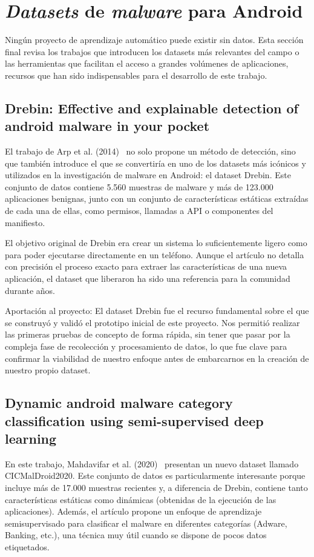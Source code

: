 \section{\textit{Datasets} de \textit{malware} para Android}

Ningún proyecto de aprendizaje automático puede existir sin datos. Esta sección final revisa los trabajos que introducen los datasets más relevantes del campo o las herramientas que facilitan el acceso a grandes volúmenes de aplicaciones, recursos que han sido indispensables para el desarrollo de este trabajo.

\subsection{Drebin: Effective and explainable detection of android malware in your pocket}
El trabajo de Arp et al. (2014)~\cite{arp2014drebin} no solo propone un método de detección, sino que también introduce el que se convertiría en uno de los datasets más icónicos y utilizados en la investigación de malware en Android: el dataset Drebin. Este conjunto de datos contiene 5.560 muestras de malware y más de 123.000 aplicaciones benignas, junto con un conjunto de características estáticas extraídas de cada una de ellas, como permisos, llamadas a API o componentes del manifiesto.

El objetivo original de Drebin era crear un sistema lo suficientemente ligero como para poder ejecutarse directamente en un teléfono. Aunque el artículo no detalla con precisión el proceso exacto para extraer las características de una nueva aplicación, el dataset que liberaron ha sido una referencia para la comunidad durante años.

Aportación al proyecto: El dataset Drebin fue el recurso fundamental sobre el que se construyó y validó el prototipo inicial de este proyecto. Nos permitió realizar las primeras pruebas de concepto de forma rápida, sin tener que pasar por la compleja fase de recolección y procesamiento de datos, lo que fue clave para confirmar la viabilidad de nuestro enfoque antes de embarcarnos en la creación de nuestro propio dataset.

\subsection{Dynamic android malware category classification using semi-supervised deep learning}

En este trabajo, Mahdavifar et al. (2020)~\cite{mahdavifar2020dynamic} presentan un nuevo dataset llamado CICMalDroid2020. Este conjunto de datos es particularmente interesante porque incluye más de 17.000 muestras recientes y, a diferencia de Drebin, contiene tanto características estáticas como dinámicas (obtenidas de la ejecución de las aplicaciones). Además, el artículo propone un enfoque de aprendizaje semisupervisado para clasificar el malware en diferentes categorías (Adware, Banking, etc.), una técnica muy útil cuando se dispone de pocos datos etiquetados.

